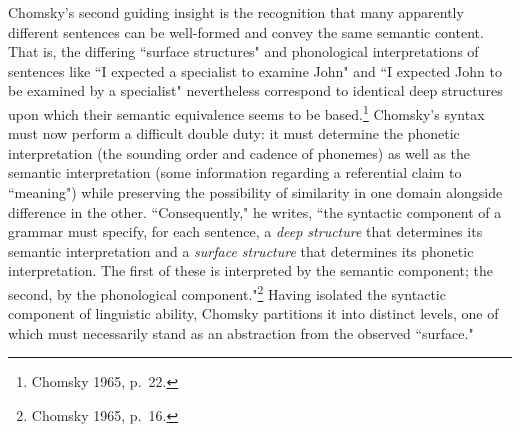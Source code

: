 Chomsky's second guiding insight is the recognition that many apparently different sentences can be well-formed and convey the same semantic content.  That is, the differing ``surface structures" and phonological interpretations of sentences like ``I expected a specialist to examine John" and ``I expected John to be examined by a specialist" nevertheless correspond to identical deep structures upon which their semantic equivalence seems to be based.\footnote{Chomsky 1965, p.\ 22.}  Chomsky's syntax must now perform a difficult double duty: it must determine the phonetic interpretation (the sounding order and cadence of phonemes) as well as the semantic interpretation (some information regarding a referential claim to ``meaning") while preserving the possibility of similarity in one domain alongside difference in the other.  ``Consequently," he writes, ``the syntactic component of a grammar must specify, for each sentence, a \emph{deep structure} that determines its semantic interpretation and a \emph{surface structure} that determines its phonetic interpretation.  The first of these is interpreted by the semantic component; the second, by the phonological component."\footnote{Chomsky 1965, p.\ 16.}  Having isolated the syntactic component of linguistic ability, Chomsky partitions it into distinct levels, one of which must necessarily stand as an abstraction from the observed ``surface."

